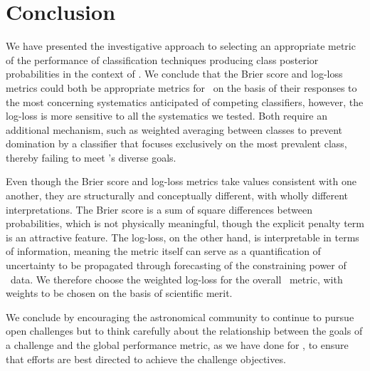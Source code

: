 \section{Conclusion}
\label{sec:conclusion}

We have presented the investigative approach to selecting an appropriate metric of the performance of classification techniques producing class posterior probabilities in the context of \plasticc.
We conclude that the Brier score and log-loss metrics could both be appropriate metrics for \plasticc\ on the basis of their responses to the most concerning systematics anticipated of competing classifiers, however, the log-loss is more sensitive to all the systematics we tested.
Both require an additional mechanism, such as weighted averaging between classes to prevent domination by a classifier that focuses exclusively on the most prevalent class, thereby failing to meet \plasticc's diverse goals.

Even though the Brier score and log-loss metrics take values consistent with one another, they are structurally and conceptually different, with wholly different interpretations.
The Brier score is a sum of square differences between probabilities, which is not physically meaningful, though the explicit penalty term is an attractive feature.
The log-loss, on the other hand, is interpretable in terms of information, meaning the metric itself can serve as a quantification of uncertainty to be propagated through forecasting of the constraining power of \lsst\ data.
We therefore choose the weighted log-loss for the overall \plasticc\ metric, with weights to be chosen on the basis of scientific merit.

We conclude by encouraging the astronomical community to continue to pursue open challenges but to think carefully about the relationship between the goals of a challenge and the global performance metric, as we have done for \plasticc, to ensure that efforts are best directed to achieve the challenge objectives.
